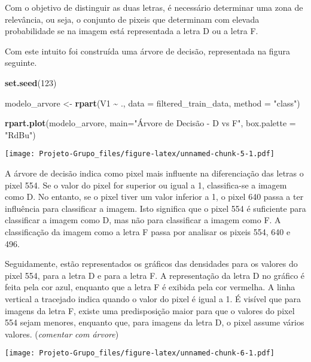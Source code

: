 \documentclass[
]{article}
\newenvironment{Shaded}{\begin{snugshade}}{\end{snugshade}}
\newcommand{\AttributeTok}[1]{\textcolor[rgb]{0.13,0.29,0.53}{#1}}
\newcommand{\DecValTok}[1]{\textcolor[rgb]{0.00,0.00,0.81}{#1}}
\newcommand{\FunctionTok}[1]{\textcolor[rgb]{0.13,0.29,0.53}{\textbf{#1}}}
\newcommand{\NormalTok}[1]{#1}
\newcommand{\OtherTok}[1]{\textcolor[rgb]{0.56,0.35,0.01}{#1}}
\newcommand{\SpecialCharTok}[1]{\textcolor[rgb]{0.81,0.36,0.00}{\textbf{#1}}}
\newcommand{\StringTok}[1]{\textcolor[rgb]{0.31,0.60,0.02}{#1}}
\begin{document}
Com o objetivo de distinguir as duas letras, é necessário determinar uma
zona de relevância, ou seja, o conjunto de pixeis que determinam com
elevada probabilidade se na imagem está representada a letra D ou a
letra F.

Com este intuito foi construída uma árvore de decisão, representada na
figura seguinte.

\begin{Shaded}
\begin{Highlighting}[]
\FunctionTok{set.seed}\NormalTok{(}\DecValTok{123}\NormalTok{)}

\NormalTok{modelo\_arvore }\OtherTok{\textless{}{-}} \FunctionTok{rpart}\NormalTok{(V1 }\SpecialCharTok{\textasciitilde{}}\NormalTok{ ., }\AttributeTok{data =}\NormalTok{ filtered\_train\_data, }\AttributeTok{method =} \StringTok{"class"}\NormalTok{)}

\FunctionTok{rpart.plot}\NormalTok{(modelo\_arvore, }\AttributeTok{main=}\StringTok{"Árvore de Decisão {-} \textquotesingle{}D\textquotesingle{} vs \textquotesingle{}F\textquotesingle{}"}\NormalTok{,}
           \AttributeTok{box.palette =} \StringTok{"RdBu"}\NormalTok{)}
\end{Highlighting}
\end{Shaded}

\texttt{[image: Projeto-Grupo\_files/figure-latex/unnamed-chunk-5-1.pdf]}

A árvore de decisão indica como pixel mais influente na diferenciação
das letras o pixel 554. Se o valor do pixel for superior ou igual a 1,
classifica-se a imagem como D. No entanto, se o pixel tiver um valor
inferior a 1, o pixel 640 passa a ter influência para classificar a
imagem. Isto significa que o pixel 554 é suficiente para classificar a
imagem como D, mas não para classificar a imagem como F. A classificação
da imagem como a letra F passa por analisar os pixeis 554, 640 e 496.

Seguidamente, estão representados os gráficos das densidades para os
valores do pixel 554, para a letra D e para a letra F. A representação
da letra D no gráfico é feita pela cor azul, enquanto que a letra F é
exibida pela cor vermelha. A linha vertical a tracejado indica quando o
valor do pixel é igual a 1. É visível que para imagens da letra F,
existe uma predisposição maior para que o valores do pixel 554 sejam
menores, enquanto que, para imagens da letra D, o pixel assume vários
valores. (\emph{comentar com árvore})

\texttt{[image: Projeto-Grupo\_files/figure-latex/unnamed-chunk-6-1.pdf]}
\end{document}

